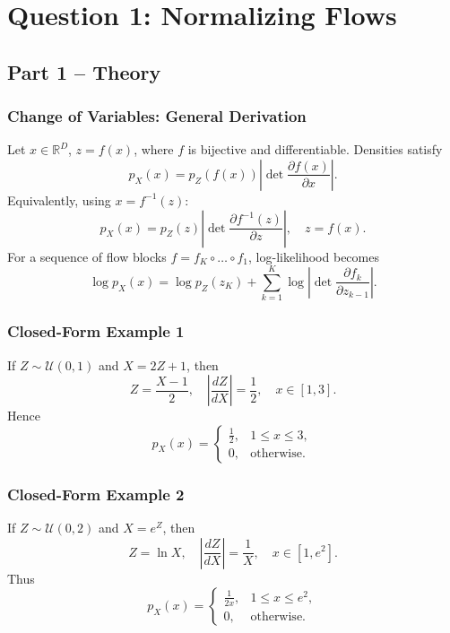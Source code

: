 \documentclass[conference]{IEEEtran}
\begin{document}
\section{Question 1: Normalizing Flows}

\subsection{Part 1 -- Theory}

\subsubsection{Change of Variables: General Derivation}
Let $x\in\mathbb{R}^D$, $z=f(x)$, where $f$ is bijective and differentiable. Densities satisfy
\begin{equation}
 p_X(x)=p_Z(f(x))\left|\det\frac{\partial f(x)}{\partial x}\right|.
\label{eq:cov_fwd}
\end{equation}
Equivalently, using $x=f^{-1}(z)$:
\begin{equation}
 p_X(x)=p_Z(z)\left|\det\frac{\partial f^{-1}(z)}{\partial z}\right|,\quad z=f(x).
\label{eq:cov_inv}
\end{equation}
For a sequence of flow blocks $f=f_K\circ\dots\circ f_1$, log-likelihood becomes
\begin{equation}
\log p_X(x)=\log p_Z(z_K)+\sum_{k=1}^{K}\log\left|\det\frac{\partial f_k}{\partial z_{k-1}}\right|.
\label{eq:chain_flow}
\end{equation}

\subsubsection{Closed-Form Example 1}
If $Z\sim\mathcal{U}(0,1)$ and $X=2Z+1$, then
\begin{equation}
 Z=\frac{X-1}{2},\quad \left|\frac{dZ}{dX}\right|=\frac{1}{2},\quad x\in[1,3].
\end{equation}
Hence
\begin{equation}
 p_X(x)=\begin{cases}
\frac{1}{2}, & 1\le x\le 3, \\
0, & \text{otherwise}.
\end{cases}
\end{equation}

\subsubsection{Closed-Form Example 2}
If $Z\sim\mathcal{U}(0,2)$ and $X=e^Z$, then
\begin{equation}
 Z=\ln X,\quad \left|\frac{dZ}{dX}\right|=\frac{1}{X},\quad x\in[1,e^2].
\end{equation}
Thus
\begin{equation}
 p_X(x)=\begin{cases}
\frac{1}{2x}, & 1\le x\le e^2,\\
0, & \text{otherwise}.
\end{cases}
\end{equation}
\end{document}
